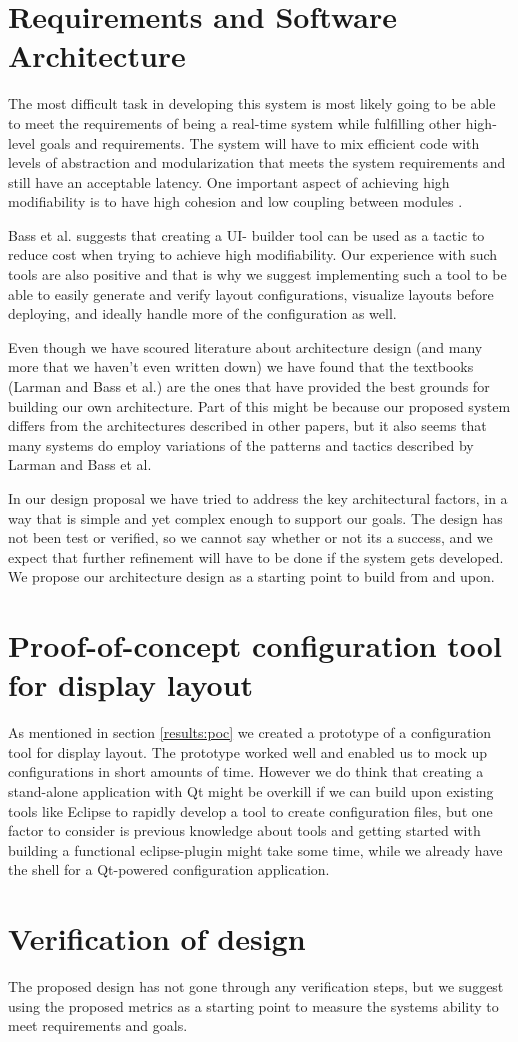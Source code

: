 \section{Requirements and Software Architecture}

The most difficult task in developing this system is most likely going to be able to
meet the requirements of being a real-time system while fulfilling other
high-level goals and requirements. The system will have to mix efficient code
with levels of abstraction and modularization that meets the system
requirements and still have an acceptable latency. One important aspect of
achieving high modifiability is to have high cohesion and low coupling between
modules \cite[p. 123]{bass2012software}. 

Bass et al. \cite[p. 118]{bass2012software} suggests that creating a UI-
builder tool can be used as a tactic to reduce cost when trying to achieve 
high modifiability. Our experience with such tools are also positive and that
is why we suggest implementing such a tool to be able to easily generate and 
verify layout configurations, visualize layouts before deploying, and ideally 
handle more of the configuration as well. 

Even though we have scoured literature about architecture design
\cite{goebl2007realtimecapable,bass2012software,duenas1998software,magee1995specifying,Allen97Thesis,Larman:UML}
(and many more that we haven't even written down) we have found that the
textbooks (Larman and Bass et al.) are the ones that have provided the best
grounds for building our own architecture. Part of this might be because our
proposed system differs from the architectures described in other papers, but
it also seems that many systems do employ variations of the patterns and
tactics described by Larman and Bass et al. 

In our design proposal we have tried to address the key architectural factors,
in a way that is simple and yet complex enough to support our goals. The
design has not been test or verified, so we cannot say whether or not its a
success, and we expect that further refinement will have to be done if the
system gets developed. We propose our architecture design as a starting point
to build from and upon. 

\section{Proof-of-concept configuration tool for display layout}
As mentioned in section \vref{results:poc} we created a prototype of a
configuration tool for display layout. The prototype worked well and enabled us
to mock up configurations in short amounts of time. However we do think that
creating a stand-alone application with Qt might be overkill if we can build
upon existing tools like Eclipse \cite{eclipse} to rapidly develop a tool to
create configuration files, but one factor to consider is previous knowledge
about tools and getting started with building a functional eclipse-plugin might
take some time, while we already have the shell for a Qt-powered configuration
application. 

\section{Verification of design}
The proposed design has not gone through any verification steps, but we suggest
using the proposed metrics as a starting point to measure the systems ability
to meet requirements and goals. 
